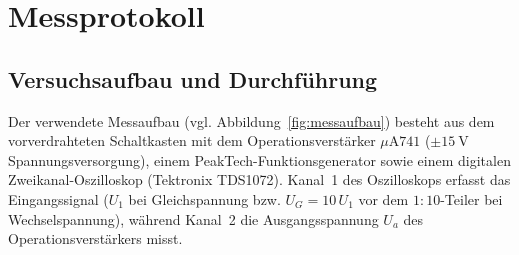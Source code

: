 \documentclass[12pt,a4paper,titlepage]{scrartcl}
\numberwithin{equation}{section}
\numberwithin{table}{section}
\numberwithin{figure}{section}
\begin{document}
\section{Messprotokoll}\label{sec:Messprotokoll}

\subsection{Versuchsaufbau und Durchführung}

Der verwendete Messaufbau (vgl. Abbildung~\ref{fig:messaufbau}) besteht aus dem vorverdrahteten Schaltkasten mit dem Operationsverstärker $\mu\text{A}741$ ($\pm\SI{15}{\volt}$ Spannungsversorgung), einem PeakTech-Funktionsgenerator sowie einem digitalen Zweikanal-Oszilloskop (Tektronix TDS1072). Kanal~1 des Oszilloskops erfasst das Eingangssignal ($U_1$ bei Gleichspannung bzw. $U_G = 10\,U_1$ vor dem $1{:}10$-Teiler bei Wechselspannung), während Kanal~2 die Ausgangsspannung $U_a$ des Operationsverstärkers misst.
\end{document}
